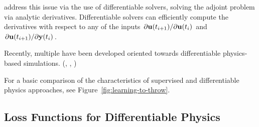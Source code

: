 \cite{holl2019pdecontrol} address this issue via the use of differentiable
solvers, solving the adjoint problem  via analytic derivatives.
Differentiable solvers can efficiently compute the derivatives with respect to
any of the inputs $\pdv*{\vb{u}(t_{i+1})}{\vb{u}(t_i)}$ and
$\pdv*{\vb{u}(t_{i+1})}{\vb{y}(t_i)}$.

Recently, multiple have been developed oriented towards differentiable
physics-based simulations. (\cite{difftaichi},
\cite{holl2019pdecontrol},\cite{warp2022} ) 



For a basic comparison of the characteristics of supervised and differentiable
physics approaches, see Figure~\ref{fig:learning-to-throw}.


\subsection{Loss Functions for Differentiable Physics}
\label{dp-loss}

